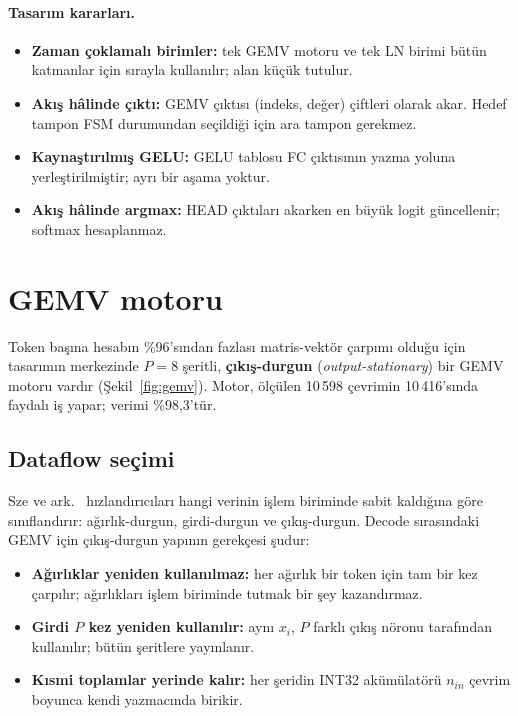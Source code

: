 \paragraph{Tasarım kararları.}
\begin{itemize}
  \item \textbf{Zaman çoklamalı birimler:} tek GEMV motoru ve tek LN birimi bütün katmanlar için sırayla kullanılır; alan küçük tutulur.
  \item \textbf{Akış hâlinde çıktı:} GEMV çıktısı (indeks, değer) çiftleri olarak akar. Hedef tampon FSM durumundan seçildiği için ara tampon gerekmez.
  \item \textbf{Kaynaştırılmış GELU:} GELU tablosu FC çıktısının yazma yoluna yerleştirilmiştir; ayrı bir aşama yoktur.
  \item \textbf{Akış hâlinde argmax:} HEAD çıktıları akarken en büyük logit güncellenir; softmax hesaplanmaz.
\end{itemize}

\section{GEMV motoru}\label{sec:gemv}

Token başına hesabın \%96'sından fazlası matris-vektör çarpımı olduğu için tasarımın merkezinde $P=8$ şeritli, \textbf{çıkış-durgun} (\emph{output-stationary}) bir GEMV motoru vardır (Şekil~\ref{fig:gemv}). Motor, ölçülen 10\,598 çevrimin 10\,416'sında faydalı iş yapar; verimi \%98,3'tür.

\subsection{Dataflow seçimi}
Sze ve ark.\ \cite{sze17} hızlandırıcıları hangi verinin işlem biriminde sabit kaldığına göre sınıflandırır: ağırlık-durgun, girdi-durgun ve çıkış-durgun. Decode sırasındaki GEMV için çıkış-durgun yapının gerekçesi şudur:
\begin{itemize}
  \item \textbf{Ağırlıklar yeniden kullanılmaz:} her ağırlık bir token için tam bir kez çarpılır; ağırlıkları işlem biriminde tutmak bir şey kazandırmaz.
  \item \textbf{Girdi $P$ kez yeniden kullanılır:} aynı $x_i$, $P$ farklı çıkış nöronu tarafından kullanılır; bütün şeritlere yayınlanır.
  \item \textbf{Kısmi toplamlar yerinde kalır:} her şeridin INT32 akümülatörü $n_{in}$ çevrim boyunca kendi yazmacında birikir.
\end{itemize}

